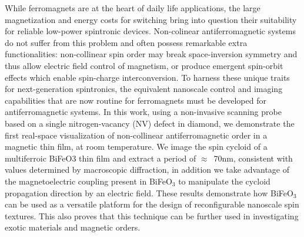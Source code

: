 While ferromagnets are at the heart of daily life applications, the large magnetization and energy costs for switching bring into question their suitability for reliable low-power spintronic devices. Non-colinear antiferromagnetic systems do not suffer from this problem and often possess remarkable extra functionalities: non-collinear spin order\cite{Coey_1987}  may break space-inversion symmetry\cite{Kimura_2003,Cheong_2007} and thus allow electric field control of magnetism\cite{Lottermoser_2004,Heron_2014}, or produce emergent spin-orbit effects\cite{Nayak_2016,Hanke_2016} which enable spin-charge interconversion\cite{Zhang_2016}. To harness these unique traits for next-generation spintronics, the equivalent nanoscale control and imaging capabilities that are now routine for ferromagnets must be developed for antiferromagnetic systems. In this work, using a non-invasive scanning probe based on a single nitrogen-vacancy (NV) defect in diamond\cite{Maze_2008}, we demonstrate the first real-space visualization of non-collinear antiferromagnetic order in a magnetic thin film, at room temperature. We image the spin cycloid of a multiferroic BiFeO3 thin film and extract a period of $\approx$~70nm, consistent with values determined by macroscopic diffraction, in addition we take advantage of the magnetoelectric coupling present in BiFeO$_3$ to manipulate the cycloid propagation direction by an electric field. These results demonstrate how BiFeO$_3$ can be used as a versatile platform for the design of reconfigurable nanoscale spin textures. This also proves that this technique can be further used in investigating exotic materials and magnetic orders.